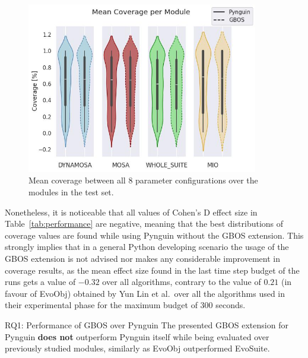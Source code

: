 \documentclass[%
  chapterprefix=false,%
  open=right,%
  twoside=true,%
  paper=a4,%
  logofile={Figures/logo.png},%
  thesistype=master,%
  UKenglish,%
]{se2thesis}
\begin{document}
\begin{figure}[tbh]
  \centering
  \includegraphics[width=0.9\textwidth]{Figures/Results/Coverage.jpg}
  \caption{Mean coverage between all 8 parameter configurations over the modules in the test set.}\label{fig:coverage}
\end{figure}

Nonetheless, it is noticeable that all values of Cohen's D effect size in Table~\ref{tab:performance} are negative, meaning that the best distributions of coverage values are found while using Pynguin without the GBOS extension.
This strongly implies that in a general Python developing scenario the usage of the GBOS extension is not advised nor makes any considerable improvement in coverage results, as the mean effect size found in the last time step budget of the runs gets a value of \(-0.32\) over all algorithms, contrary to the value of \(0.21\) (in favour of EvoObj) obtained by Yun Lin et al.\ over all the algorithms used in their experimental phase for the maximum budget of 300 seconds. 

\begin{table}[h!]
  \centering
  
  \centering
  
  \centering
  
  \caption{Coverage Performance of Pynguin and GBOS with different time budgets.}\label{tab:performance}
\end{table}

\begin{summary}{RQ1: Performance of GBOS over Pynguin}
  The presented GBOS extension for Pynguin \textbf{does not} outperform Pynguin itself while being evaluated over previously studied modules, similarly as EvoObj outperformed EvoSuite. 
\end{summary}
\end{document}

